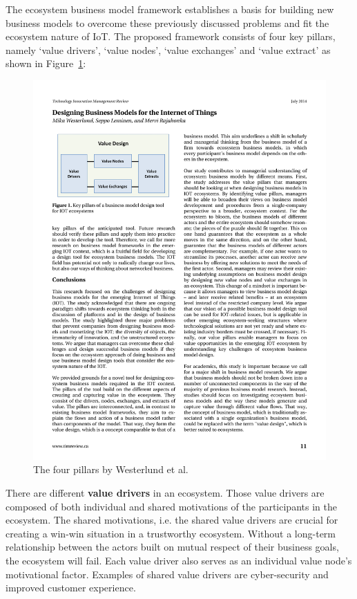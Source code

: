 		\vspace{-1em}
		The ecosystem business model framework establishes a basis for building new business models to overcome these previously discussed problems and fit the ecosystem nature of IoT. The proposed framework consists of four key pillars, namely `value drivers', `value nodes', `value exchanges' and `value extract' as shown in Figure~\ref{Westerlund pillars}:

			\begin{figure}[!htb]
			    \begin{center}
			    \includegraphics[scale=1.0]{Talk11/westerlundpillars.pdf}
			    \end{center}
			    \caption{The four pillars by Westerlund et al. \cite{westerlund}}
			    \label{Westerlund pillars}
			\end{figure}
		There are different \textbf{value drivers} in an ecosystem. Those value drivers are composed of both individual and shared motivations of the participants in the ecosystem. The shared motivations, i.e. the shared value drivers are crucial for creating a win-win situation in a trustworthy ecosystem. Without a long-term relationship between the actors built on mutual respect of their business goals, the ecosystem will fail. Each value driver also serves as an individual value node's motivational factor. Examples of shared value drivers are cyber-security and improved customer experience.\\
